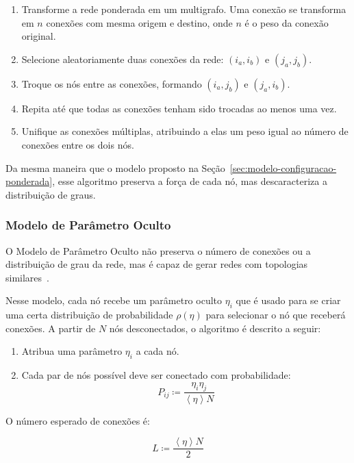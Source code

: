 \documentclass[12pt,a4paper]{article}
\theoremstyle{hypo}
\newcommand{\avg}[1]{\left\langle #1 \right\rangle} %
\newcommand{\defn}{\coloneqq} %
\begin{document}
\begin{enumerate}
\item Transforme a rede ponderada em um multigrafo. Uma conexão se transforma em $n$ conexões com mesma origem e destino, onde $n$ é o peso da conexão original.
\item Selecione aleatoriamente duas conexões da rede: $(i_a, i_b)$ e $(j_a, j_b)$.
\item Troque os nós entre as conexões, formando $(i_a, j_b)$ e $(j_a, i_b)$. 
\item Repita até que todas as conexões tenham sido trocadas ao menos uma vez.
\item Unifique as conexões múltiplas, atribuindo a elas um peso igual ao número de conexões entre os dois nós.
\end{enumerate}

Da mesma maneira que o modelo proposto na Seção~\ref{sec:modelo-configuracao-ponderada}, esse algoritmo preserva a força de cada nó, mas descaracteriza a distribuição de graus.

\subsubsection{Modelo de Parâmetro Oculto}

O Modelo de Parâmetro Oculto não preserva o número de conexões ou a distribuição de grau da rede, mas é capaz de gerar redes com topologias similares~\cite{Barabasi2016-rn}.

Nesse modelo, cada nó recebe um parâmetro oculto $\eta_i$ que é usado para se criar uma certa distribuição de probabilidade $\rho(\eta)$ para selecionar o nó que receberá conexões. A partir de $N$ nós desconectados, o algoritmo é descrito a seguir:

\begin{enumerate}
\item Atribua uma parâmetro $\eta_i$ a cada nó.
\item Cada par de nós possível deve ser conectado com probabilidade:
\begin{equation}
P_{ij} \defn \frac{\eta_i \eta_j}{\avg{\eta}N}
\end{equation}
\end{enumerate}

O número esperado de conexões é:

\begin{equation}
L \defn \frac{\avg{\eta}N}{2} 
\end{equation}
\end{document}
